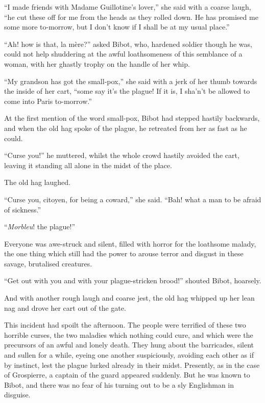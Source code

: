 \documentclass[paper=a5,BCOR=7mm,twoside,DIV=calc,12pt,usegeometry,chapterprefix,endperiod,headings=big]{scrbook}
\begin{document}
\enquote{I made friends with Madame Guillotine's lover,} she said with a coarse laugh, \enquote{he cut these off for me from the heads as they rolled down. He has promised me some more to-morrow, but I don't know if I shall be at my usual place.}

\enquote{Ah! how is that, la mère?} asked Bibot, who, hardened soldier though he was, could not help shuddering at the awful loathsomeness of this semblance of a woman, with her ghastly trophy on the handle of her whip.

\enquote{My grandson has got the small-pox,} she said with a jerk of her thumb towards the inside of her cart, \enquote{some say it's the plague! If it is, I sha'n’t be allowed to come into Paris to-morrow.}

At the first mention of the word small-pox, Bibot had stepped hastily backwards, and when the old hag spoke of the plague, he retreated from her as fast as he could.

\enquote{Curse you!} he muttered, whilst the whole crowd hastily avoided the cart, leaving it standing all alone in the midst of the place.

The old hag laughed.

\enquote{Curse you, citoyen, for being a coward,} she said. \enquote{Bah! what a man to be afraid of sickness.}

\enquote{\textit{Morbleu}! the plague!}

Everyone was awe-struck and silent, filled with horror for the loathsome malady, the one thing which still had the power to arouse terror and disgust in these savage, brutalised creatures.

\enquote{Get out with you and with your plague-stricken brood!} shouted Bibot, hoarsely.

And with another rough laugh and coarse jest, the old hag whipped up her lean nag and drove her cart out of the gate.

This incident had spoilt the afternoon. The people were terrified of these two horrible curses, the two maladies which nothing could cure, and which were the precursors of an awful and lonely death. They hung about the barricades, silent and sullen for a while, eyeing one another suspiciously, avoiding each other as if by instinct, lest the plague lurked already in their midst. Presently, as in the case of Grospierre, a captain of the guard appeared suddenly. But he was known to Bibot, and there was no fear of his turning out to be a sly Englishman in disguise.
\end{document}
